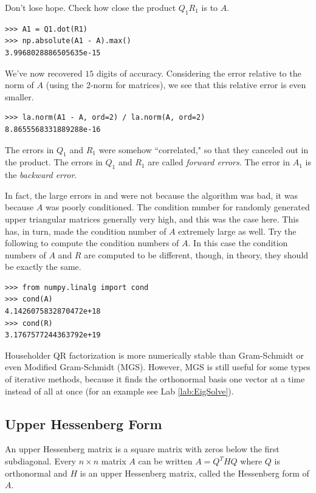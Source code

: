 Don't lose hope.
Check how close the product $Q_1 R_1$ is to $A$.
\begin{lstlisting}
>>> A1 = Q1.dot(R1)
>>> np.absolute(A1 - A).max()
3.9968028886505635e-15
\end{lstlisting}
We've now recovered $15$ digits of accuracy.
Considering the error relative to the norm of $A$ (using the 2-norm for matrices), we see that this relative error is even smaller.
\begin{lstlisting}
>>> la.norm(A1 - A, ord=2) / la.norm(A, ord=2)
8.8655568331889288e-16
\end{lstlisting}
The errors in $Q_1$ and $R_1$ were somehow ``correlated," so that they canceled out in the product.
The errors in $Q_1$ and $R_1$ are called \emph{forward errors}.
The error in $A_1$ is the \emph{backward error}.

In fact, the large errors in  and  were not because the algorithm was bad, it was because $A$ was poorly conditioned.
The condition number for randomly generated upper triangular matrices generally very high, and this was the case here.
This has, in turn, made the condition number of $A$ extremely large as well.
Try the following to compute the condition numbers of $A$.
In this case the condition numbers of $A$ and $R$ are computed to be different, though, in theory, they should be exactly the same.
\begin{lstlisting}
>>> from numpy.linalg import cond
>>> cond(A)
4.1426075832870472e+18
>>> cond(R)
3.1767577244363792e+19
\end{lstlisting}

Householder QR factorization is more numerically stable than Gram-Schmidt or even Modified Gram-Schmidt (MGS).
However, MGS is still useful for some types of iterative methods, because it finds the orthonormal basis one vector at a time instead of all at once (for an example see Lab \ref{lab:EigSolve}).

\subsection*{Upper Hessenberg Form}
An upper Hessenberg matrix is a square matrix with zeros below the first subdiagonal.
Every  $n \times n$ matrix $A$ can be written $A = Q^THQ$ where $Q$ is orthonormal and $H$ is an upper Hessenberg matrix, called the Hessenberg form of $A$.

